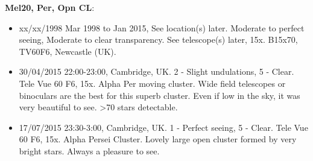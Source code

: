 {\bf Mel20, Per, Opn CL}:
\begin{itemize}
\item xx/xx/1998 Mar 1998 to Jan 2015, See location(s) later. Moderate to perfect seeing, Moderate to clear transparency. See telescope(s) later, 15x. B15x70, TV60F6, Newcastle (UK).
\item 30/04/2015 22:00-23:00, Cambridge, UK. 2 - Slight undulations, 5 - Clear. Tele Vue 60 F6, 15x. Alpha Per moving cluster. Wide field telescopes or binoculars are the best for this superb cluster. Even if low in the sky, it was very beautiful to see. >70 stars detectable.
\item 17/07/2015 23:30-3:00, Cambridge, UK. 1 - Perfect seeing, 5 - Clear. Tele Vue 60 F6, 15x. Alpha Persei Cluster. Lovely large open cluster formed by very bright stars. Always a pleasure to see.
\end{itemize}
